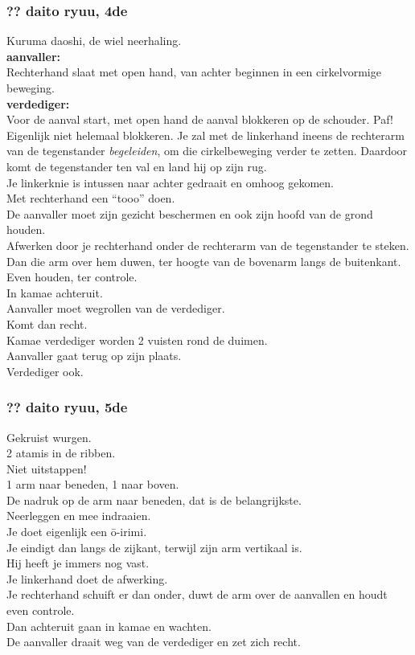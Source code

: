 \subsubsection{?? daito ryuu, 4de}
Kuruma daoshi, de wiel neerhaling.\\
\textbf{aanvaller:}\\
Rechterhand slaat met open hand, van achter beginnen in een cirkelvormige beweging.\\
\textbf{verdediger:}\\
Voor de aanval start, met open hand de aanval blokkeren op de schouder. Paf!\\
Eigenlijk niet helemaal blokkeren. Je zal met de linkerhand ineens de rechterarm van de tegenstander \textit{begeleiden}, om die cirkelbeweging verder te zetten. Daardoor komt de tegenstander ten val en land hij op zijn rug.\\
Je linkerknie is intussen naar achter gedraait en omhoog gekomen.\\
Met rechterhand een ``tooo'' doen.\\
De aanvaller moet zijn gezicht beschermen en ook zijn hoofd van de grond houden.\\
Afwerken door je rechterhand onder de rechterarm van de tegenstander te steken. Dan die arm over hem duwen, ter hoogte van de bovenarm langs de buitenkant.\\
Even houden, ter controle.\\
In kamae achteruit.\\
Aanvaller moet wegrollen van de verdediger.\\
Komt dan recht.\\
Kamae verdediger worden 2 vuisten rond de duimen.\\
Aanvaller gaat terug op zijn plaats.\\
Verdediger ook.

\subsubsection{?? daito ryuu, 5de}
Gekruist wurgen.\\
2 atamis in de ribben.\\
Niet uitstappen!\\
1 arm naar beneden, 1 naar boven.\\
De nadruk op de arm naar beneden, dat is de belangrijkste.\\
Neerleggen en mee indraaien.\\
Je doet eigenlijk een \={o}-irimi.\\
Je eindigt dan langs de zijkant, terwijl zijn arm vertikaal is.\\
Hij heeft je immers nog vast.\\
Je linkerhand doet de afwerking.\\
Je rechterhand schuift er dan onder, duwt de arm over de aanvallen en houdt even controle.\\
Dan achteruit gaan in kamae en wachten.\\
De aanvaller draait weg van de verdediger en zet zich recht.

